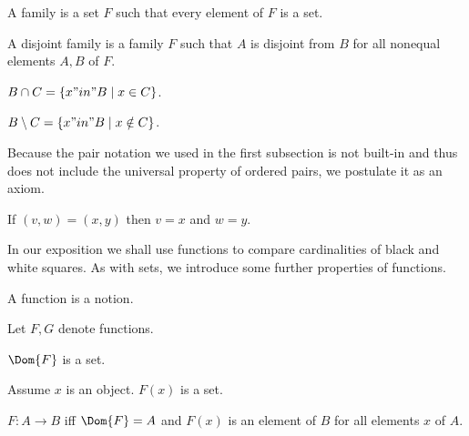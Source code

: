 \documentclass{article}
\begin{document}
\begin{forthel}
    \begin{definition}
        A family is a set $F$ such that every element of $F$ is a set.
    \end{definition}

    \begin{definition}
        A disjoint family is a family $F$ such that
        $A$ is disjoint from $B$ for all nonequal elements $A, B$ of $F$.
    \end{definition}

    \begin{definition}
        $B \cap C = \{ x "in" B \mid x \in C\}$.
    \end{definition}

    \begin{definition}
        $B \setminus C = \{ x "in" B \mid x \notin C\}$.
    \end{definition}
\end{forthel}

Because the pair notation we used in the first subsection is not built-in
and thus does not include the universal property of ordered pairs,
we postulate it as an axiom.

\begin{forthel}
    \begin{axiom}
        If $(v, w) = (x, y)$ then $v = x$ and $w = y$.
    \end{axiom}
\end{forthel}

In our exposition we shall use functions to compare cardinalities of black and white squares.
As with sets, we introduce some further properties of functions.

\begin{forthel}
    \begin{signature}
        A function is a notion.
    \end{signature}

    Let $F,G$ denote functions.

    \begin{signature}
        $\Dom{F}$ is a set.
    \end{signature}

    \begin{signature}
        Assume $x$ is an object.
        $F(x)$ is a set.
    \end{signature}

    \begin{definition}
        $F : A \to B$ iff $\Dom{F} = A$ and
        $F(x)$ is an element of $B$ for all elements $x$ of $A$.
    \end{definition}
\end{forthel}
\end{document}
